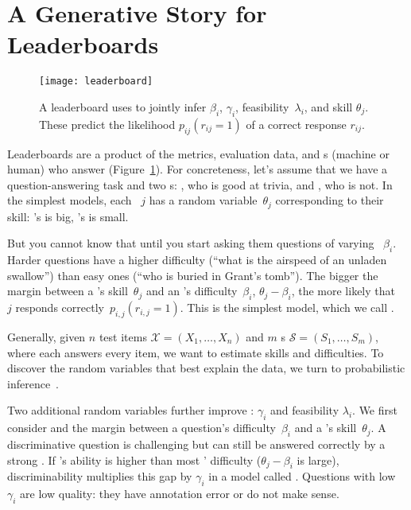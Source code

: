 \section{A Generative Story for Leaderboards}
\label{ch:isicle:lead}

\begin{figure}[t]
  \centering
  \texttt{[image: leaderboard]}
  \caption{
    A \name{} leaderboard uses \irt{} to jointly infer \itm{} \diff{} $\beta_i$, \discability{} $\gamma_i$, feasibility~$\lambda_i$, and \subj{} skill $\theta_j$.
    These predict the likelihood $p_{ij}(r_{ij}=1)$ of a correct response $r_{ij}$.
  }
  \label{fig:story}
\end{figure}

Leaderboards are a product of the metrics, evaluation data, and
\subj{}s (machine or human) who answer \itms{}
(Figure~\ref{fig:story}).
For concreteness, let's assume that we have a question-answering task and two \subj{}s: \smart{},
who is good at trivia, and \dumb{}, who is not.
In the simplest \irt{} models, each \subj{}~$j$ has a random
variable~$\theta_j$ corresponding to their skill: \smart{}'s is big,
\dumb{}'s is small.

But you cannot know that until you start asking them questions of
varying ~$\beta_i$.
Harder questions have a higher difficulty (``what is the airspeed of
an unladen swallow'') than easy ones (``who is buried in Grant's
tomb'').
The bigger the margin between a \subj{}'s skill~$\theta_j$ and an \itm{}'s
difficulty~$\beta_i$, $\theta_j-\beta_i$, the more likely that \subj{}~$j$
responds correctly~$p_{i,j}(r_{i,j}=1)$.
This is the simplest  model, which we call {\bf {}}.

Generally, given $n$ test items $\mathcal{X}=(X_1,\ldots,X_n)$
and $m$ \subj{}s
$\mathcal{S}=(S_1,\ldots,S_m)$, where each \subj{} answers every
item, we want to estimate \subj{} skills and \itm{} difficulties.
To discover the random variables that best explain the data, we
turn to probabilistic inference~\cite{pearl-88}.


Two additional random variables further improve \name{}:
\discability{} $\gamma_i$ and feasibility $\lambda_i$.
We first consider \discability{} and the margin between a
question's difficulty~$\beta_i$ and a \subj{}'s skill~$\theta_j$.
A discriminative question is challenging but can still be answered
correctly by a strong \subj{}.
If \smart{}'s ability is higher than most \itms{}' difficulty
($\theta_j-\beta_i$ is large), \itm{} discriminability multiplies this
gap by $\gamma_i$ in a model called {\bf {}}.
Questions with low $\gamma_i$ are low quality: they have annotation
error or do not make sense.

